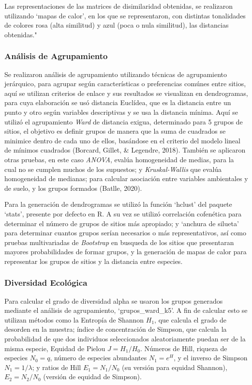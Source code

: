 \documentclass[11pt,]{article}
\begin{document}
Las representaciones de las matrices de disimilaridad obtenidas, se
realizaron utilizando `mapas de calor', en los que se representaron, con
distintas tonalidades de colores rosa (alta similitud) y azul (poca o
nula similitud), las distancias obtenidas."

\subsubsection{Análisis de
Agrupamiento}\label{anuxe1lisis-de-agrupamiento}

Se realizaron análisis de agrupamiento utilizando técnicas de
agrupamiento jerárquico, para agrupar según características o
preferencias comúnes entre sitios, aquí se utilizan criterios de enlace
y sus resultados se visualizan en dendrogramas, para cuya elaboración se
usó distancia Euclídea, que es la distancia entre un punto y otro según
variables descriptivas y se usa la distancia mínima. Aquí se utilizó el
agrupamiento \emph{Ward} de distancia exigua, determinado para 5 grupos
de sitios, el objetivo es definir grupos de manera que la suma de
cuadrados se minimice dentro de cada uno de ellos, basándose en el
criterio del modelo lineal de mínimos cuadrados (Borcard, Gillet, \&
Legendre, 2018). También se aplicaron otras pruebas, en este caso
\emph{ANOVA}, evalúa homogeneidad de medias, para la cual no se cumplen
muchos de los supuestos; y \emph{Kruskal-Wallis} que evalúa homogeneidad
de medianas; para calcular asociación entre variables ambientales y de
suelo, y los grupos formados (Batlle, 2020).

Para la generación de dendrogramas se utilizó la función `hclust' del
paquete `stats', presente por defecto en R. A su vez se utilizó
correlación cofenética para determinar el número de grupos de sitios más
apropiado; y `anchura de silueta' para determinar cuantos grupos serían
necesarios o más representativos, así como pruebas multivariadas de
\emph{Bootstrap} en busqueda de los sitios que presentaran mayores
probabilidades de formar grupos, y la generación de mapas de calor para
representar los grupos de sitios y la distancia entre especies.

\subsubsection{Diversidad Ecológica}\label{diversidad-ecoluxf3gica}

Para calcular el grado de diversidad alpha se usaron los grupos
generados mediante el análisis de agrupamiento, `grupos\_ward\_k5'. A
fin de calcular esto se utilizan métodos como la Entropía de Shannon
\(H_1\), que calcula el grado de desorden en la muestra; índice de
concentración de Simpson, que calcula la probabilidad de que dos
individuos seleccionados aleatoriamente puedan ser de la misma especie,
Equidad de Pielou \(J=H_1/H_0\). Números de Hill, riqueza de especies
\(N_0=q\), número de especies abundantes \(N_1=e^H\), y el inverso de
Simpson \(N_1=1/\lambda\); y ratios de Hill \(E_1=N_1/N_0\) (su versión
para equidad Shannon), \(E_2=N_2/N_0\) (versión de equidad de Simpson).
\end{document}
